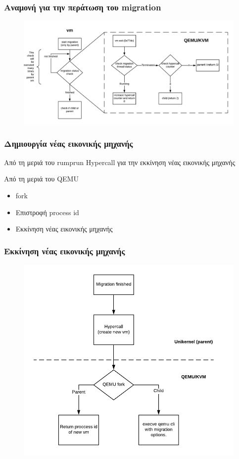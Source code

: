 \documentclass[red,slidestop,notes,compress,mathserif]{beamer}
\begin{document}
\begin{frame}
\frametitle{Αναμονή για την περάτωση του migration}
\begin{figure}
\center
\includegraphics[scale=0.57]{figures/check_migration_status.png}
\end{figure}
\end{frame}

\begin{frame}
\frametitle{Δημιουργία νέας εικονικής μηχανής}
\begin{block}{Από τη μεριά του rumprun}
Hypercall για την εκκίνηση νέας εικονικής μηχανής
\end{block}
\begin{block}{Από τη μεριά του QEMU}
\begin{itemize}
\item fork 
\item Επιστροφή process id 
\item Εκκίνηση νέας εικονικής μηχανής 
\end{itemize}
\end{block}
\end{frame}

\begin{frame}
\frametitle{Εκκίνηση νέας εικονικής μηχανής}
\begin{figure}
\center
\includegraphics[scale=0.57]{figures/fork_stage2.png}
\end{figure}
\end{frame}
\end{document}
